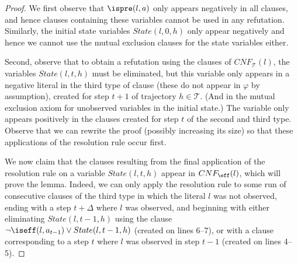 {\begin{proof}
We first observe that $\ispre(l,a)$ only appears negatively in all clauses, and hence clauses containing these variables cannot be used in any refutation. Similarly, the initial state variables $State(l,0,h)$ only appear negatively and hence we cannot use the mutual exclusion clauses for the state variables either.

Second, observe that to obtain a refutation using the clauses of $CNF_{\mathcal{T}}(l)$, the variables $State(l,t,h)$ must be eliminated, but this variable only appears in a negative literal in the third type of clause (these do not appear in $\varphi$ by assumption), created for step $t+1$ of trajectory $h\in\mathcal{T}$. (And in the mutual exclusion axiom for unobserved variables in the initial state.) The variable only appears positively in the clauses created for step $t$ of the second and third type. Observe that we can rewrite the proof (possibly increasing its size) so that these applications of the resolution rule occur first.

We now claim that the clauses resulting from the final application of the resolution rule on a variable $State(l,t,h)$ appear in $CNF_{\eff}(l)$, which will prove the lemma. Indeed, we can only apply the resolution rule to some run of consecutive clauses of the third type in which the literal $l$ was not observed, ending with a step $t+\Delta$ where $l$ was observed, and beginning with either eliminating $State(l,t-1,h)$ using the clause $\neg \iseff(l,a_{t-1})\vee State(l,t-1,h)$ (created on lines 6--7), or with a clause corresponding to a step $t$ where $l$ was observed in step $t-1$ (created on lines 4--5). 
\end{proof}
}\fi
















